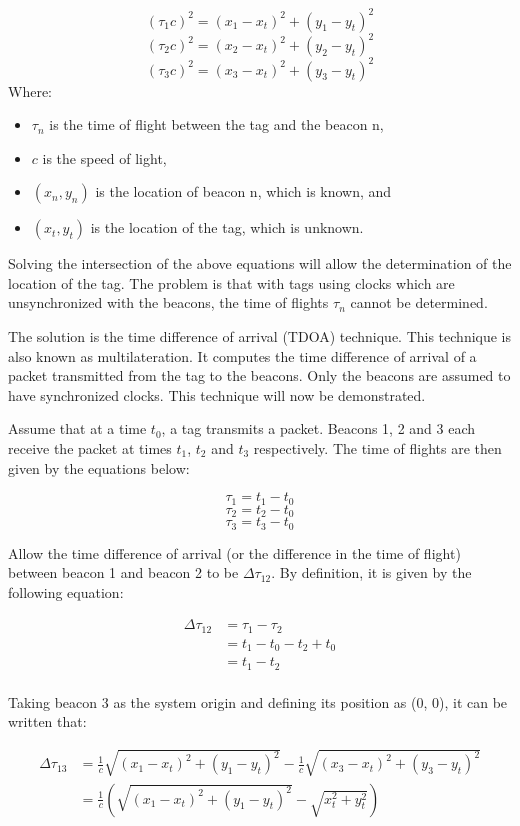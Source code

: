 $$(\tau_1 c)^2 = (x_1-x_t)^2 + (y_1-y_t)^2$$
$$(\tau_2 c)^2 = (x_2-x_t)^2 + (y_2-y_t)^2$$
$$(\tau_3 c)^2 = (x_3-x_t)^2 + (y_3-y_t)^2$$
Where:
\begin{itemize}
\item $\tau_n$ is the time of flight between the tag and the beacon n,
\item $c$ is the speed of light,
\item $(x_n,y_n)$ is the location of beacon n, which is known, and
\item $(x_t,y_t)$ is the location of the tag, which is unknown.
\end{itemize}

\newpage
Solving the intersection of the above equations will allow the determination of the location of the tag. The problem is that with tags using clocks which are unsynchronized with the beacons, the time of flights $\tau_n$ cannot be determined.

The solution is the time difference of arrival (TDOA) technique. This technique is also known as multilateration. It computes the time difference of arrival of a packet transmitted from the tag to the beacons. Only the beacons are assumed to have synchronized clocks. This technique will now be demonstrated.

Assume that at a time $t_0$, a tag transmits a packet. Beacons 1, 2 and 3 each receive the packet at times $t_1$, $t_2$ and $t_3$ respectively. The time of flights are then given by the equations below:

$$\tau_1 = t_1 - t_0$$
$$\tau_2 = t_2 - t_0$$
$$\tau_3 = t_3 - t_0$$

Allow the time difference of arrival (or the difference in the time of flight) between beacon 1 and beacon 2 to be $\Delta \tau_{12}$. By definition, it is given by the following equation:

\begin{equation*}
\begin{split}
\Delta \tau_{12} &= \tau_1 - \tau_2\\
 &= t_1 - t_0 - t_2 + t_0\\
 &= t_1 - t_2\\
\end{split}
\end{equation*}

Taking beacon 3 as the system origin and defining its position as (0, 0), it can be written that:

\begin{equation*}
\begin{split}
\Delta \tau_{13} &= \frac{1}{c} \sqrt{(x_1-x_t)^2 + (y_1-y_t)^2} - \frac{1}{c} \sqrt{(x_3-x_t)^2 + (y_3-y_t)^2}\\ 
&= \frac{1}{c} (\sqrt{(x_1-x_t)^2 + (y_1-y_t)^2} - \sqrt{x_t^2 + y_t^2})
\end{split}
\end{equation*}

